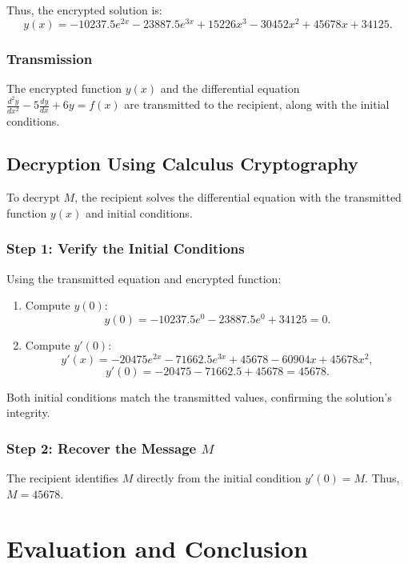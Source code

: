 \documentclass[12pt]{article}
\begin{document}
Thus, the encrypted solution is:
\[
y(x) = -10237.5e^{2x} - 23887.5e^{3x} + 15226x^3 - 30452x^2 + 45678x + 34125.
\]

\subsubsection*{Transmission}
The encrypted function \( y(x) \) and the differential equation \( \frac{d^2y}{dx^2} - 5\frac{dy}{dx} + 6y = f(x) \) are transmitted to the recipient, along with the initial conditions.

\subsection*{Decryption Using Calculus Cryptography}

To decrypt \( M \), the recipient solves the differential equation with the transmitted function \( y(x) \) and initial conditions.

\subsubsection*{Step 1: Verify the Initial Conditions}

Using the transmitted equation and encrypted function:
\begin{enumerate}
    \item Compute \( y(0) \):
    \[
    y(0) = -10237.5e^0 - 23887.5e^0 + 34125 = 0.
    \]

    \item Compute \( y'(0) \):
    \[
    y'(x) = -20475e^{2x} - 71662.5e^{3x} + 45678 - 60904x + 45678x^2,
    \]
    \[
    y'(0) = -20475 - 71662.5 + 45678 = 45678.
    \]
\end{enumerate}

Both initial conditions match the transmitted values, confirming the solution's integrity.

\subsubsection*{Step 2: Recover the Message \( M \)}
The recipient identifies \( M \) directly from the initial condition \( y'(0) = M \). Thus, \( M = 45678 \).




\section*{Evaluation and Conclusion}
\end{document}
